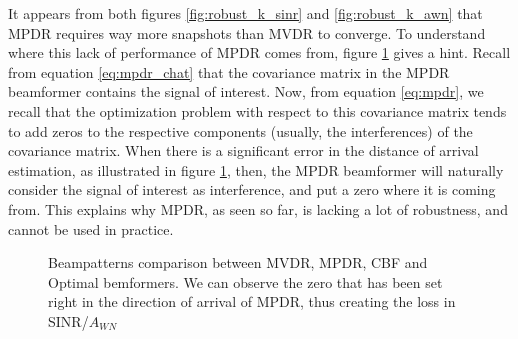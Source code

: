\documentclass[12pt]{article}
\begin{document}
It appears from both figures \ref{fig:robust_k_sinr} and \ref{fig:robust_k_awn} that MPDR requires way more snapshots than MVDR to converge. To understand where this lack of performance of MPDR comes from, figure \ref{fig:poor_mvdr_beampattern} gives a hint. Recall from equation \ref{eq:mpdr_chat} that the covariance matrix in the MPDR beamformer contains the signal of interest. Now, from equation \ref{eq:mpdr}, we recall that the optimization problem with respect to this covariance matrix tends to add zeros to the respective components (usually, the interferences) of the covariance matrix. When there is a significant error in the distance of arrival estimation, as illustrated in figure \ref{fig:poor_mvdr_beampattern}, then, the MPDR beamformer will naturally consider the signal of interest as interference, and put a zero where it is coming from. This explains why MPDR, as seen so far, is lacking a lot of robustness, and cannot be used in practice.

\begin{figure}[H]
    \centering
    
    \caption{Beampatterns comparison between MVDR, MPDR, CBF and Optimal bemformers. We can observe the zero that has been set right in the direction of arrival of MPDR, thus creating the loss in SINR/$A_{WN}$}
    \label{fig:poor_mvdr_beampattern}
\end{figure}
\end{document}
